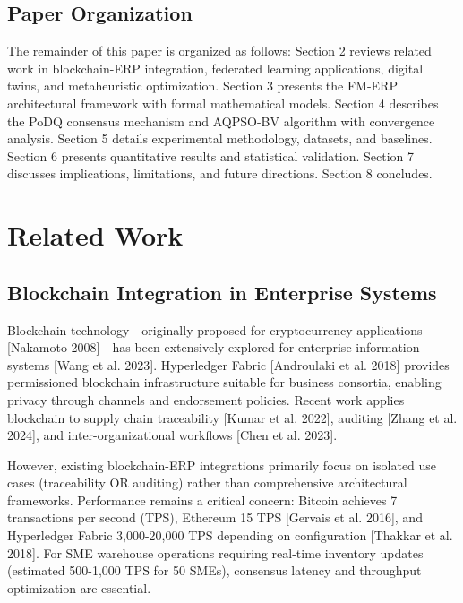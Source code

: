 \documentclass[times,10pt,twocolumn]{jucs2e}
\begin{document}
\subsection{Paper Organization}

The remainder of this paper is organized as follows: Section 2 reviews related work in blockchain-ERP integration, federated learning applications, digital twins, and metaheuristic optimization. Section 3 presents the FM-ERP architectural framework with formal mathematical models. Section 4 describes the PoDQ consensus mechanism and AQPSO-BV algorithm with convergence analysis. Section 5 details experimental methodology, datasets, and baselines. Section 6 presents quantitative results and statistical validation. Section 7 discusses implications, limitations, and future directions. Section 8 concludes.


\section{Related Work}

\subsection{Blockchain Integration in Enterprise Systems}

Blockchain technology—originally proposed for cryptocurrency applications [Nakamoto 2008]—has been extensively explored for enterprise information systems [Wang et al. 2023]. Hyperledger Fabric [Androulaki et al. 2018] provides permissioned blockchain infrastructure suitable for business consortia, enabling privacy through channels and endorsement policies. Recent work applies blockchain to supply chain traceability [Kumar et al. 2022], auditing [Zhang et al. 2024], and inter-organizational workflows [Chen et al. 2023].

However, existing blockchain-ERP integrations primarily focus on isolated use cases (traceability OR auditing) rather than comprehensive architectural frameworks. Performance remains a critical concern: Bitcoin achieves 7 transactions per second (TPS), Ethereum 15 TPS [Gervais et al. 2016], and Hyperledger Fabric 3,000-20,000 TPS depending on configuration [Thakkar et al. 2018]. For SME warehouse operations requiring real-time inventory updates (estimated 500-1,000 TPS for 50 SMEs), consensus latency and throughput optimization are essential.
\end{document}
